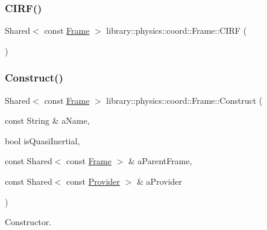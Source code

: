 \mbox{\label{classlibrary_1_1physics_1_1coord_1_1_frame_a0786e3028527a43e423936989a9cd294}} 
\subsubsection{\texorpdfstring{C\+I\+R\+F()}{CIRF()}}
{\footnotesize\ttfamily Shared$<$ const \hyperlink{classlibrary_1_1physics_1_1coord_1_1_frame}{Frame} $>$ library\+::physics\+::coord\+::\+Frame\+::\+C\+I\+RF (\begin{DoxyParamCaption}{ }\end{DoxyParamCaption})\hspace{0.3cm}{\ttfamily [static]}}

\mbox{\label{classlibrary_1_1physics_1_1coord_1_1_frame_acdadad4d650b63c1d4ad05d5268e0b79}} 
\subsubsection{\texorpdfstring{Construct()}{Construct()}}
{\footnotesize\ttfamily Shared$<$ const \hyperlink{classlibrary_1_1physics_1_1coord_1_1_frame}{Frame} $>$ library\+::physics\+::coord\+::\+Frame\+::\+Construct (\begin{DoxyParamCaption}\item[{const String \&}]{a\+Name,  }\item[{bool}]{is\+Quasi\+Inertial,  }\item[{const Shared$<$ const \hyperlink{classlibrary_1_1physics_1_1coord_1_1_frame}{Frame} $>$ \&}]{a\+Parent\+Frame,  }\item[{const Shared$<$ const \hyperlink{classlibrary_1_1physics_1_1coord_1_1frame_1_1_provider}{Provider} $>$ \&}]{a\+Provider }\end{DoxyParamCaption})\hspace{0.3cm}{\ttfamily [static]}}



Constructor. 


